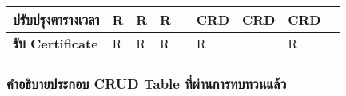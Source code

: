 \begin{landscape}
\begin{table}[H]
\begin{tabularx}{\textwidth}{|l|X|X|X|l|X|l|X|l|}
\textbf{ปรับปรุงตารางเวลา}        & R              & R                     & R                     &                                        & CRD                   & \multicolumn{1}{c|}{CRD}                           & CRD                           &                                              \\ \hline
\textbf{รับ Certificate}          & R              & R                     & R                     &                                        & R                     &                                                    & R                             &                                              \\ \hline
\end{tabularx}
\end{table}
\end{landscape}

\subsubsection{คำอธิบายประกอบ CRUD Table ที่ผ่านการทบทวนแล้ว}

